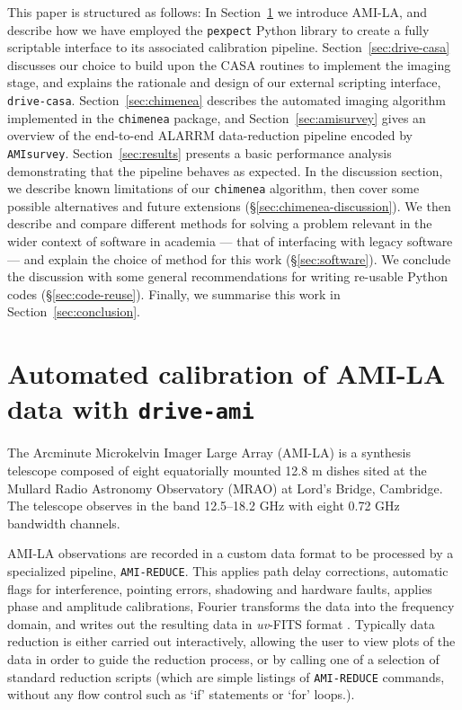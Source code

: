 \documentclass[5p,authoryear]{elsarticle}
\begin{document}
This paper is structured as follows: 
% 
In Section~\ref{sec:drive-ami} we introduce AMI-LA, and describe how we have employed the \texttt{pexpect} Python library to create a fully scriptable interface to its associated calibration pipeline.
% 
Section~\ref{sec:drive-casa} discusses our choice to build upon the CASA routines to implement the imaging stage, and explains the rationale and design of our external
scripting interface, \texttt{drive-casa}.
Section~\ref{sec:chimenea} describes the automated imaging algorithm implemented in the \texttt{chimenea} package, and Section~\ref{sec:amisurvey} gives an overview of the end-to-end ALARRM data-reduction pipeline encoded by \texttt{AMIsurvey}.
Section~\ref{sec:results} presents a basic performance analysis demonstrating that the pipeline behaves as expected.
In the discussion section, we describe known limitations of our \texttt{chimenea} algorithm, then cover some possible alternatives and future extensions (\S\ref{sec:chimenea-discussion}). 
We then describe and compare different methods for solving a problem relevant in the wider context of software in academia --- that of interfacing with legacy software --- and explain the choice of method for this work (\S\ref{sec:software}). 
We conclude the discussion with some general recommendations for writing re-usable Python codes (\S\ref{sec:code-reuse}). 
Finally, we summarise this work in Section~\ref{sec:conclusion}.


\section{Automated calibration of AMI-LA data with \texttt{drive-ami}}
\label{sec:drive-ami}
The Arcminute Microkelvin Imager Large Array (AMI-LA) is a synthesis telescope composed
of eight equatorially mounted 12.8 m dishes sited at the Mullard
Radio Astronomy Observatory (MRAO) at Lord’s Bridge, Cambridge. The
telescope observes in the band 12.5–18.2 GHz with eight 0.72 GHz
bandwidth channels. 

AMI-LA observations are recorded in a custom data format to be processed by a specialized pipeline, \texttt{AMI-REDUCE}. 
This applies path delay corrections, automatic flags for interference, pointing errors, shadowing and hardware faults, applies phase and amplitude calibrations, Fourier transforms the data into the frequency domain, and writes out the resulting data in \textit{uv}-FITS format \citep{Davies2009}. 
Typically data reduction is either carried out interactively, allowing the user to view plots of the data in order to guide the reduction process, or by calling one of a selection of standard reduction scripts (which are simple listings of \texttt{AMI-REDUCE} commands, without any flow control such as `if' statements or `for' loops.). 
\end{document}

